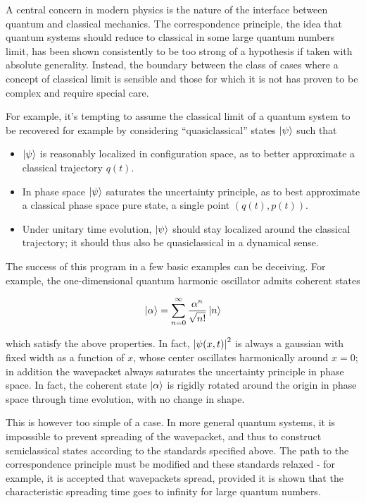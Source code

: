 \documentclass{article}
\begin{document}
A central concern in modern physics is the nature of the interface between quantum and classical mechanics. The correspondence principle, the idea that quantum systems should reduce to classical in some large quantum numbers limit, has been shown consistently to be too strong of a hypothesis if taken with absolute generality. Instead, the boundary between the class of cases where a concept of classical limit is sensible and those for which it is not has proven to be complex and require special care.

For example, it's tempting to assume the classical limit of a quantum system to be recovered for example by considering ``quasiclassical'' states $\ket \psi$ such that

\begin{itemize}
    \item $\ket \psi$ is reasonably localized in configuration space, as to better approximate a classical trajectory $q(t)$.
    \item In phase space $\ket \psi$ saturates the uncertainty principle, as to best approximate a classical phase space pure state, a single point $(q(t),p(t))$.
    \item Under unitary time evolution, $\ket \psi$ should stay localized around the classical trajectory; it should thus also be quasiclassical in a dynamical sense.
\end{itemize}

The success of this program in a few basic examples can be deceiving. For example, the one-dimensional quantum harmonic oscillator admits coherent states

\begin{equation}
    \ket\alpha = \sum_{n=0}^{\infty} \frac{\alpha^n}{\sqrt{n!}} \ket n
\end{equation}

which satisfy the above properties. In fact, $\abs{\psi(x,t)}^2$ is always a gaussian with fixed width as a function of $x$, whose center oscillates harmonically around $x=0$; in addition the wavepacket always saturates the uncertainty principle in phase space. In fact, the coherent state $\ket \alpha$ is rigidly rotated around the origin in phase space through time evolution, with no change in shape.

This is however too simple of a case. In more general quantum systems, it is impossible to prevent spreading of the wavepacket, and thus to construct semiclassical states according to the standards specified above. The path to the correspondence principle must be modified and these standards relaxed - for example, it is accepted that wavepackets spread, provided it is shown that the characteristic spreading time goes to infinity for large quantum numbers.
\end{document}

